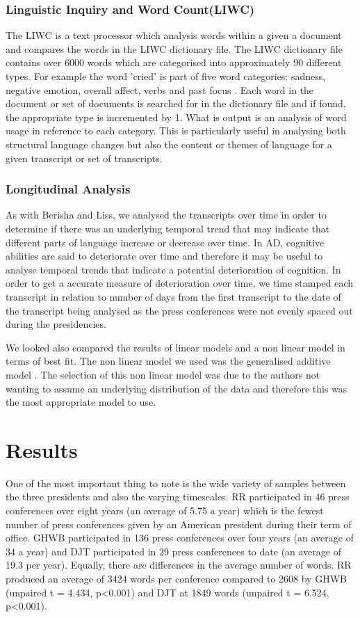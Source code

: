\documentclass[10pt, letterpaper, twoside, openany]{thesis}
\begin{document}
\subsubsection{Linguistic Inquiry and Word Count(LIWC)}
The LIWC is a text processor which analysis words within a given a document and compares the words in the LIWC dictionary file. The LIWC dictionary file contains over 6000 words which are categorised into approximately 90 different types. For example the word 'cried' is part of five word categories: sadness, negative emotion, overall affect, verbs and past focus \cite{Pennebaker2015}. Each word in the document or set of documents is searched for in the dictionary file and if found, the appropriate type is incremented by 1. What is output is an analysis of word usage in reference to each category. This is particularly useful in analysing both structural language changes but also the content or themes of language for a given transcript or set of transcripts.

\subsubsection{Longitudinal Analysis}
As with Berisha and Liss\cite{Berisha2015}, we analysed the transcripts over time in order to determine if there was an underlying temporal trend that may indicate that different parts of language increase or decrease over time. In AD, cognitive abilities are said to deteriorate over time and therefore it may be useful to analyse temporal trends that indicate a potential deterioration of cognition. In order to get a accurate measure of deterioration over time, we time stamped each transcript in relation to number of days from the first transcript to the date of the transcript being analysed as the press conferences were not evenly spaced out during the presidencies.
\par
We looked also compared the results of linear models and a non linear model in terms of best fit. The non linear model we used was the generalised additive model \cite{Hastie1986}. The selection of this non linear model was due to the authors not wanting to assume an underlying distribution of the data and therefore this was the most appropriate model to use. 

\section{Results}\label{results}
One of the most important thing to note is the wide variety of samples between the three presidents and also the varying timescales. RR participated in 46 press conferences over eight years (an average of 5.75 a year) which is the fewest number of press conferences given by an American president during their term of office. GHWB participated in 136 press conferences over four years (an average of 34 a year) and DJT participated in 29 press conferences to date (an average of 19.3 per year). Equally, there are differences in the average number of words. RR produced an average of 3424 words per conference compared to 2608 by GHWB (unpaired t = 4.434, p\textless 0.001) and DJT at 1849 words (unpaired t = 6.524, p\textless 0.001).
\end{document}
